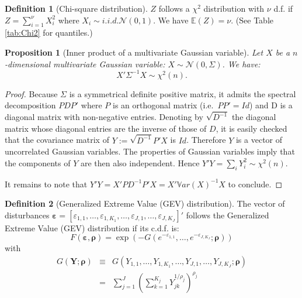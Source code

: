 \documentclass[
  12pt,
]{book}
\newtheorem{proposition}{Proposition}[chapter]
\theoremstyle{definition}
\newtheorem{definition}{Definition}[chapter]
\theoremstyle{definition}
\theoremstyle{definition}
\theoremstyle{definition}
\theoremstyle{remark}
\begin{document}
\begin{definition}[Chi-square distribution]
\protect\hypertarget{def:chi2}{}\label{def:chi2}\(Z\) follows a \(\chi^2\) distribution with \(\nu\) d.f. if \(Z = \sum_{i=1}^{\nu}X_i^2\) where \(X_i \sim i.i.d. \mathcal{N}(0,1)\).
We have \(\mathbb{E}(Z)=\nu\). (See Table \ref{tab:Chi2} for quantiles.)
\end{definition}

\begin{proposition}[Inner product of a multivariate Gaussian variable]
\protect\hypertarget{prp:waldtypeproduct}{}\label{prp:waldtypeproduct}Let \(X\) be a \(n\)-dimensional multivariate Gaussian variable: \(X \sim \mathcal{N}(0,\Sigma)\). We have:
\[
X' \Sigma^{-1}X \sim \chi^2(n).
\]
\end{proposition}

\begin{proof}
Because \(\Sigma\) is a symmetrical definite positive matrix, it admits the spectral decomposition \(PDP'\) where \(P\) is an orthogonal matrix (i.e.~\(PP'=Id\)) and D is a diagonal matrix with non-negative entries. Denoting by \(\sqrt{D^{-1}}\) the diagonal matrix whose diagonal entries are the inverse of those of \(D\), it is easily checked that the covariance matrix of \(Y:=\sqrt{D^{-1}}P'X\) is \(Id\). Therefore \(Y\) is a vector of uncorrelated Gaussian variables. The properties of Gaussian variables imply that the components of \(Y\) are then also independent. Hence \(Y'Y=\sum_i Y_i^2 \sim \chi^2(n)\).

It remains to note that \(Y'Y=X'PD^{-1}P'X=X'\mathbb{V}ar(X)^{-1}X\) to conclude.
\end{proof}

\begin{definition}[Generalized Extreme Value (GEV) distribution]
\protect\hypertarget{def:GEVdistri}{}\label{def:GEVdistri}The vector of disturbances \(\boldsymbol\varepsilon=[\varepsilon_{1,1},\dots,\varepsilon_{1,K_1},\dots,\varepsilon_{J,1},\dots,\varepsilon_{J,K_J}]'\) follows the Generalized Extreme Value (GEV) distribution if its c.d.f. is:
\[
F(\boldsymbol\varepsilon,\boldsymbol\rho) = \exp(-G(e^{-\varepsilon_{1,1}},\dots,e^{-\varepsilon_{J,K_J}};\boldsymbol\rho))
\]
with
\begin{eqnarray*}
G(\mathbf{Y};\boldsymbol\rho) &\equiv&  G(Y_{1,1},\dots,Y_{1,K_1},\dots,Y_{J,1},\dots,Y_{J,K_J};\boldsymbol\rho) \\
&=& \sum_{j=1}^J\left(\sum_{k=1}^{K_j} Y_{jk}^{1/\rho_j}
\right)^{\rho_j}
\end{eqnarray*}
\end{definition}
\end{document}
